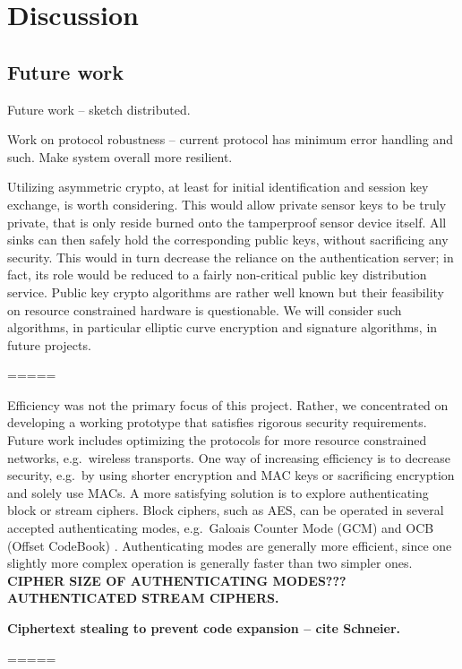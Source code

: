 
\chapter{Discussion}
\label{sec:discussion}

\section{Future work}

Future work -- sketch distributed.

Work on protocol robustness -- current protocol has minimum error handling and such. Make system overall more resilient.

Utilizing asymmetric crypto, at least for initial identification and session key exchange, is worth considering. This would allow private sensor keys to be truly private, that is only reside burned onto the tamperproof sensor device itself. All sinks can then safely hold the corresponding public keys, without sacrificing any security. This would in turn decrease the reliance on the authentication server; in fact, its role would be reduced to a fairly non-critical public key distribution service. Public key crypto algorithms are rather well known but their feasibility on resource constrained hardware is questionable. We will consider such algorithms, in particular elliptic curve \cite{} encryption and signature algorithms, in future projects.

=====

Efficiency was not the primary focus of this project. Rather, we concentrated on developing a working prototype that satisfies rigorous security requirements. Future work includes optimizing the protocols for more resource constrained networks, e.g.\ wireless transports. One way of increasing efficiency is to decrease security, e.g.\ by using shorter encryption and MAC keys or sacrificing encryption and solely use MACs. A more satisfying solution is to explore authenticating block or stream ciphers. Block ciphers, such as AES, can be operated in several accepted authenticating modes, e.g.\ Galoais Counter Mode (GCM) \cite{} and OCB (Offset CodeBook) \cite{}. Authenticating modes are generally more efficient, since one slightly more complex operation is generally faster than two simpler ones. \textbf{CIPHER SIZE OF AUTHENTICATING MODES???} \textbf{AUTHENTICATED STREAM CIPHERS.}

\textbf{Ciphertext stealing to prevent code expansion -- cite Schneier.}

=====

